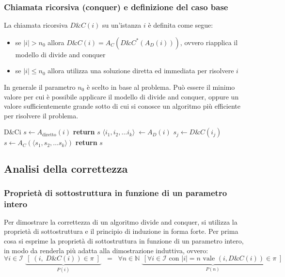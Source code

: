 \subsubsection*{Chiamata ricorsiva (conquer) e definizione del caso base}
La chiamata ricorsiva \(D\&C(i)\) su un'istanza \(i\) è definita come segue:
\begin{itemize}
	\item se \(|i| > n_0\) allora \(D\&C(i) = A_C(D\&C^*(A_D(i)))\), ovvero riapplica il modello di divide and conquer
	\item se \(|i| \leq n_0\) allora utilizza una soluzione diretta ed immediata per risolvere \(i\)
\end{itemize}
In generale il parametro \(n_0\) è scelto in base al problema. Può essere il minimo valore per cui è possibile applicare
il modello di divide and conquer, oppure un valore sufficientemente grande sotto di cui si conosce un algoritmo più
efficiente per risolvere il problema.

\begin{algo}{D\&C}{i}{}{}
 
	\State \(s \gets A_\text{diretto}(i)\) 
	\State \textbf{return} \(s\)
\Else {}
	\State \(\langle i_1, i_2, \dots i_k\rangle \; \gets A_D(i)\) 
	 
		\State \(s_j \gets D\&C(i_j)\)
	\EndFor
	\State \(s \gets A_C(\langle s_1, s_2, \dots s_k \rangle)\) 
	\State \textbf{return} \(s\)
\EndIf
\end{algo}

\newpage

\subsection{Analisi della correttezza}
\subsubsection*{Proprietà di sottostruttura in funzione di un parametro intero}
Per dimostrare la correttezza di un algoritmo divide and conquer, si utilizza la proprietà di sottostruttura e il principio
di induzione in forma forte. Per prima cosa si esprime la proprietà di sottostruttura in funzione di un parametro intero,
in modo da renderla più adatta alla dimostrazione induttiva, ovvero:
\[\forall i \in \mathcal{I} \; \underbrace{\, \left[ \; (i, \; D\&C(i)) \in \pi \; \right] \,}_{P(i)} \;\; = \;\; \forall n \in \mathbb{N} \; \underbrace{\, \left[ \forall i \in \mathcal{I} \text{ con } |i| = n \text{ vale } (i, D\&C(i)) \in \pi \; \right] \,}_{P(n)}\]

